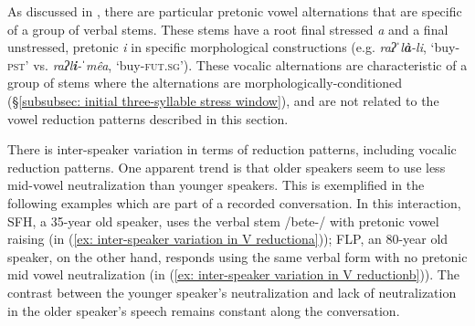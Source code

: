     \z
\z

As discussed in , there are particular pretonic vowel alternations that are specific of a group of verbal stems. These stems have a root final stressed \textit{a} and a final unstressed, pretonic \textit{i} in specific morphological constructions (e.g. \textit{raʔˈl}\textbf{\textit{à}}\textit{{}-li}, ‘buy-\textsc{pst}’ vs. \textit{raʔl}\textbf{\textit{i}}\textit{{}-ˈmêa}, ‘buy-\textsc{fut.sg}’). These vocalic alternations are characteristic of a group of stems where the alternations are morphologically-conditioned (§\ref{subsubsec: initial three-syllable stress window}), and are not related to the vowel reduction patterns described in this section.

There is inter-speaker variation in terms of reduction patterns, including vocalic reduction patterns. One apparent trend is that older speakers seem to use less mid-vowel neutralization than younger speakers. This is exemplified in the following examples which are part of a recorded conversation. In this interaction, SFH, a 35-year old speaker, uses the verbal stem /bete-/ with pretonic vowel raising (in (\ref{ex: inter-speaker variation in V reductiona})); FLP, an 80-year old speaker, on the other hand, responds using the same verbal form with no pretonic mid vowel neutralization (in (\ref{ex: inter-speaker variation in V reductionb})). The contrast between the younger speaker’s neutralization and lack of neutralization in the older speaker’s speech remains constant along the conversation.

